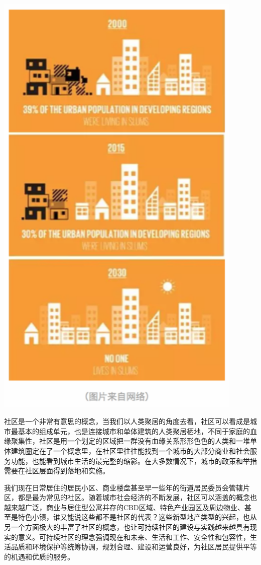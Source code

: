 \documentclass[]{book}
\begin{document}
\includegraphics[width=4.67in]{images/moma1}

社区是一个非常有意思的概念，当我们以人类聚居的角度去看，社区可以看成是城市最基本的组成单元，也是连接城市和单体建筑的人类聚居栖地，不同于家庭的血缘聚集性，社区是用一个划定的区域把一群没有血缘关系形形色色的人类和一堆单体建筑圈定在了一个概念里，在社区里往往能找到一个城市的大部分商业和社会服务功能，也能看到城市生活的最完整的缩影。在大多数情况下，城市的政策和举措需要在社区层面得到落地和实施。

我们现在日常居住的居民小区、商业楼盘甚至早一些年的街道居民委员会管辖片区，都是最为常见的社区。随着城市社会经济的不断发展，社区可以涵盖的概念也越来越广泛，商业与居住型公寓并存的CBD区域、特色产业园区及周边物业、甚至是特色小镇，谁又能说这些都不是社区的代表？这些新型地产类型的兴起，也从另一个方面极大的丰富了社区的概念，也让可持续社区的建设与实践越来越具有现实的意义。可持续社区的理念强调现在和未来、生活和工作、安全性和包容性，生活品质和环境保护等统筹协调，规划合理、建设和运营良好，为社区居民提供平等的机遇和优质的服务。
\end{document}

